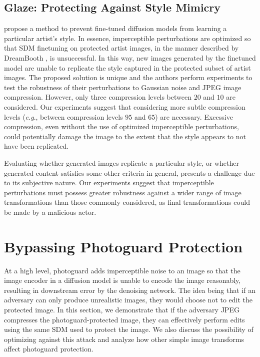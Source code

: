 \documentclass{article} %
\newcommand{\eg}{\textit{e}.\textit{g}.}
\begin{document}

\subsection{Glaze: Protecting Against Style Mimicry}

\citet{shan2023glaze} propose a method to prevent fine-tuned diffusion models from learning a particular artist's style. In essence, imperceptible perturbations are optimized so that SDM finetuning on protected artist images, in the manner described by DreamBooth \citep{ruiz2022dreambooth}, is unsuccessful. In this way, new images generated by the finetuned model are unable to replicate the style captured in the protected subset of artist images. The proposed solution is unique and the authors perform experiments to test the robustness of their perturbations to Gaussian noise and JPEG image compression. However, only three compression levels between $20$ and $10$ are considered. Our experiments suggest that considering more subtle compression levels (\eg, between compression levels $95$ and $65$) are necessary. Excessive compression, even without the use of optimized imperceptible perturbations, could potentially damage the image to the extent that the style appears to not have been replicated.

Evaluating whether generated images replicate a particular style, or whether generated content satisfies some other criteria in general, presents a challenge due to its subjective nature. Our experiments suggest that imperceptible perturbations must possess greater robustness against a wider range of image transformations than those commonly considered, as final transformations could be made by a malicious actor.

\section{Bypassing Photoguard Protection}

At a high level, photoguard adds imperceptible noise to an image so that the image encoder in a diffusion model is unable to encode the image reasonably, resulting in downstream error by the denoising network. The idea being that if an adversary can only produce unrealistic images, they would choose not to edit the protected image. In this section, we demonstrate that if the adversary JPEG compresses the photoguard-protected image, they can effectively perform edits using the same SDM used to protect the image. We also discuss the possibility of optimizing against this attack and analyze how other simple image transforms affect photoguard protection.
\end{document}
